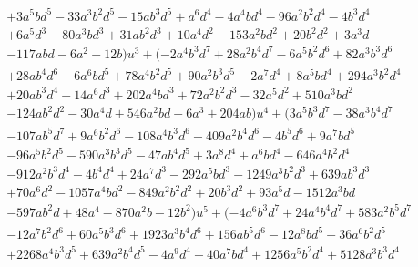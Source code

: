 \documentclass{gtpart}
\theoremstyle{definition}
\theoremstyle{remark}
\numberwithin{equation}{section}
\numberwithin{thm}{section}
\begin{document}
\begin{equation*}
\begin{split}
          & + 3 a^5 b d^5 - 33 a^3 b^2 d^5 - 15 a b^3 d^5 + a^6 d^4 - 4 a^4 b d^4 - 96 a^2 b^2 d^4 - 4 b^3 d^4 \\
          & + 6 a^5 d^3 - 80 a^3 b d^3 + 31 a b^2 d^3 + 10 a^4 d^2 - 153 a^2 b d^2 + 20 b^2 d^2 + 3 a^3 d \\
          & - 117 a b d - 6 a^2 - 12 b) u^3 + (-2 a^4 b^3 d^7 + 28 a^2 b^4 d^7 - 6 a^5 b^2 d^6 + 82 a^3 b^3 d^6 \\
          & + 28 a b^4 d^6 - 6 a^6 b d^5 + 78 a^4 b^2 d^5 + 90 a^2 b^3 d^5 - 2 a^7 d^4 + 8 a^5 b d^4 + 294 a^3 b^2 d^4 \\
          & + 20 a b^3 d^4 - 14 a^6 d^3 + 202 a^4 b d^3 + 72 a^2 b^2 d^3 - 32 a^5 d^2 + 510 a^3 b d^2 \\
          & - 124 a b^2 d^2 - 30 a^4 d + 546 a^2 b d - 6 a^3 + 204 a b) u^4 + (3 a^5 b^3 d^7 - 38 a^3 b^4 d^7 \\
          & - 107 a b^5 d^7 + 9 a^6 b^2 d^6 - 108 a^4 b^3 d^6 - 409 a^2 b^4 d^6 - 4 b^5 d^6 + 9 a^7 b d^5 \\
          & - 96 a^5 b^2 d^5 - 590 a^3 b^3 d^5 - 47 a b^4 d^5 + 3 a^8 d^4 + a^6 b d^4 - 646 a^4 b^2 d^4 \\
          & - 912 a^2 b^3 d^4 - 4 b^4 d^4 + 24 a^7 d^3 - 292 a^5 b d^3 - 1249 a^3 b^2 d^3 + 639 a b^3 d^3 \\
          & + 70 a^6 d^2 - 1057 a^4 b d^2 - 849 a^2 b^2 d^2 + 20 b^3 d^2 + 93 a^5 d - 1512 a^3 b d \\
          & - 597 a b^2 d + 48 a^4 - 870 a^2 b - 12 b^2) u^5 + (-4 a^6 b^3 d^7 + 24 a^4 b^4 d^7 + 583 a^2 b^5 d^7 \\
          & - 12 a^7 b^2 d^6 + 60 a^5 b^3 d^6 + 1923 a^3 b^4 d^6 + 156 a b^5 d^6 - 12 a^8 b d^5 + 36 a^6 b^2 d^5 \\
          & + 2268 a^4 b^3 d^5 + 639 a^2 b^4 d^5 - 4 a^9 d^4 - 40 a^7 b d^4 + 1256 a^5 b^2 d^4 + 5128 a^3 b^3 d^4 
\end{split}
\end{equation*}
\end{document}
